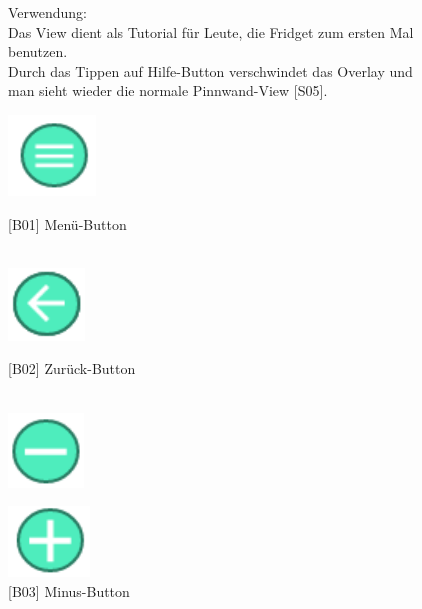 \documentclass[a4paper]{scrreprt}
\begin{document}
\begin{figure}[h!]
\begin{minipage}[t]{0.55\linewidth}
\begin{itemize}
    			\end{itemize}
    			
    			
    			\hfill 
    			
    			Verwendung:\\
    			Das View dient als Tutorial für Leute, die Fridget
    			zum ersten Mal benutzen.\\ 
    			Durch das Tippen auf 
    			Hilfe-Button verschwindet das Overlay und man 
    			sieht wieder die normale Pinnwand-View {[}S05{]}.
    			
    		\end{minipage}
    	\end{figure}
    
    	\begin{figure}[h!]
    		\begin{minipage}[t]{0.45\linewidth}
    			\flushright
    			\centering
    			\vspace{9mm}
    			\includegraphics[width=0.05\textheight]{menu_button.PNG}
    			\caption{{[}B01{]} Menü-Button}
    			\label{fig:figure1}
    			\hfill \\
    			\includegraphics[width=0.05\textheight]{back_button.PNG}
    			\caption{{[}B02{]} Zurück-Button}
    			\label{fig:figure1}
    			\hfill \\
    			\includegraphics[width=0.05\textheight]{minus_button.PNG}
    			\caption{{[}B03{]} Minus-Button}
    			\label{fig:figure1}
    			\end{minipage}
    			\hspace{0.5cm}
    			\begin{minipage}[t]{0.45\linewidth}
    			\flushright
    			\centering
    			\vspace{9mm}
    			\includegraphics[width=0.05\textheight]{plus_button.PNG}

\end{minipage}
\end{figure}
\end{document}
